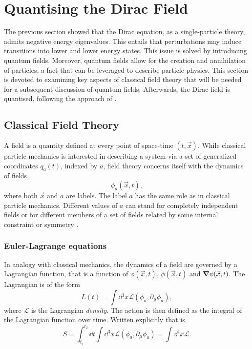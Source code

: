 \section{Quantising the Dirac Field}

The previous section showed that the Dirac equation, as a single-particle theory, admits negative energy eigenvalues. This entails that perturbations may induce transitions into lower and lower energy states. This issue is solved by introducing quantum fields. Moreover, quantum fields allow for the creation and annihilation of particles, a fact that can be leveraged to describe particle physics. This section is devoted to examining key aspects of classical field theory that will be needed for a subsequent discussion of quantum fields. Afterwards, the Dirac field is quantised, following the approach of \cite{lahiri_first_2005}.

\subsection{Classical Field Theory}\label{ss:classical_ft}
A field is a quantity defined at every point of space-time $(t,\Vec{x})$. While classical particle mechanics is interested in describing a system via a set of generalized coordinates $q_a(t)$, indexed by $a$, field theory concerns itself with the dynamics of fields, $$\phi_a(\Vec{x},t),$$ where both $\Vec{x}$ and $a$ are labels. The label $a$ has the same role as in classical particle mechanics. Different values of $a$ can stand for completely independent fields or for different members of a set of fields related by some internal constraint or symmetry \cite{lahiri_first_2005}.

\subsubsection*{Euler-Lagrange equations}
In analogy with classical mechanics, the dynamics of a field are governed by a Lagrangian function, that is a function of $\phi(\Vec{x},t)$, $\Dot{\phi}(\Vec{x},t)$ and $\grad{\phi}(\Vec{x},t)$. The Lagrangian is of the form $$L(t)=\int \dd{^3x}\mathcal{L}(\phi_a,\partial_\mu\phi_a),$$ where $\mathcal{L}$ is the Lagrangian \textit{density}. The action is then defined as the integral of the Lagrangian function over time. Written explicitly that is \cite{lahiri_first_2005} $$S=\int_{t_1}^{t_2}\dd{t}\int\dd{^3x}\mathcal{L}(\phi_a,\partial_\mu \phi_a)=\int\dd{^4x}\mathcal{L}.$$

